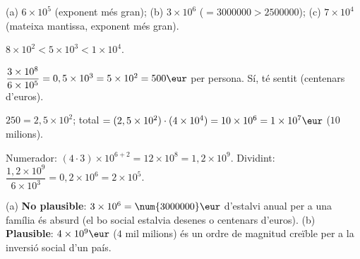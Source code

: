 \begin{solucions}
\begin{sollist}
  \item (a) $6\times 10^{5}$ (exponent més gran); \quad
        (b) $3\times 10^{6}$ ($=\num{3000000}>\num{2500000}$); \quad
        (c) $7\times 10^{4}$ (mateixa mantissa, exponent més gran).
  \item $8\times 10^{2} < 5\times 10^{3} < 1\times 10^{4}$.
  \item $\dfrac{3\times 10^{8}}{6\times 10^{5}}=0,5\times 10^{3}=5\times 10^{2}=500\eur$
        per persona. Sí, té sentit (centenars d'euros).
  \item $250=2,5\times 10^{2}$; total $=(2,5\times 10^{2})\cdot(4\times 10^{4})
        =10\times 10^{6}=1\times 10^{7}\eur$ ($10$ milions).
  \item Numerador: $(4\cdot 3)\times 10^{6+2}=12\times 10^{8}=1,2\times 10^{9}$.
        Dividint: $\dfrac{1,2\times 10^{9}}{6\times 10^{3}}=0,2\times 10^{6}=2\times 10^{5}$.
  \item (a) \textbf{No plausible}: $3\times 10^{6}=\num{3000000}\eur$ d'estalvi anual
        per a una família és absurd (el bo social estalvia desenes o centenars d'euros).
        (b) \textbf{Plausible}: $4\times 10^{9}\eur$ ($4$ mil milions) és un ordre de
        magnitud creïble per a la inversió social d'un país.
\end{sollist}
\end{solucions}
